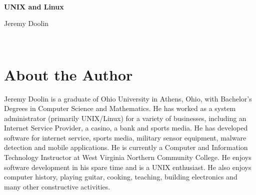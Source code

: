 \documentclass[10pt,twoside]{book}
\begin{document}
~
\vfill
{

   \centerline{\Huge\bf\lsstyle UNIX and Linux}

}

\vfill
\centerline{\huge Jeremy Doolin}
\vfill
~

\mainmatter
\fancyhead[RO,LE]{\thepage}

\setcounter{tocdepth}{1}
\setcounter{chapter}{-1}
\tableofcontents



























\backmatter

\chapter*{About the Author}

Jeremy Doolin is a graduate of Ohio University in Athens, Ohio, with Bachelor's Degrees in Computer Science and Mathematics.  He has worked as a system administrator (primarily UNIX/Linux) for a variety of businesses, including an Internet Service Provider, a casino, a bank and sports media.  He has developed software for internet service, sports media, military sensor equipment, malware detection and mobile applications.  He is currently a Computer and Information Technology Instructor at West Virginia Northern Community College.  He enjoys software development in his spare time and is a UNIX enthusiast.  He also enjoys computer history, playing guitar, cooking, teaching, building electronics and many other constructive activities.
\end{document}
